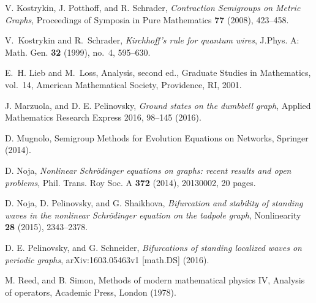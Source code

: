 \documentclass[11pt,a4paper]{amsart}
\theoremstyle{definition}
\numberwithin{equation}{section}
\begin{document}
\begin{thebibliography}{99}
{ V. Kostrykin, J. Potthoff, and R. Schrader, \emph{Contraction Semigroups on Metric Graphs},
Proceedings of Symposia in Pure Mathematics \textbf{77} (2008), 423--458.

\bibitem{[KS99]} V.~Kostrykin and R.~Schrader, \emph{{K}irchhoff's rule for quantum wires}, J.Phys. A: Math. Gen. \textbf{32} (1999), no.~4, 595--630.

E.~H. Lieb and M.~Loss, Analysis, second ed., Graduate Studies in
  Mathematics, vol.~14, American Mathematical Society, Providence, RI, 2001.

\bibitem{[MP16]}  J. Marzuola, and D. E. Pelinovsky, \emph{Ground states on the dumbbell graph}, Applied Mathematics Research Express 2016, 98--145 (2016).

 D. Mugnolo, Semigroup Methods for Evolution Equations on Networks, Springer (2014).

 D. Noja, \emph{Nonlinear Schr\"odinger equations on graphs:
recent results and open problems}, Phil. Trans. Roy Soc. A {\bf 372} (2014), 20130002,
20 pages.

\bibitem{[NPS15]} D. Noja, D. Pelinovsky, and G. Shaikhova, \emph{Bifurcation and stability of standing waves in the nonlinear Schr\"odinger
equation on the tadpole graph}, Nonlinearity {\bf 28} (2015), 2343--2378.

\bibitem{[PS16]} D. E. Pelinovsky, and G. Schneider, \emph{Bifurcations of standing localized waves on periodic graphs},  arXiv:1603.05463v1 [math.DS] (2016).

 M. Reed, and B. Simon, Methods of modern mathematical physics IV, Analysis of operators, Academic Press, London (1978).}
\end{thebibliography}
\end{document}
